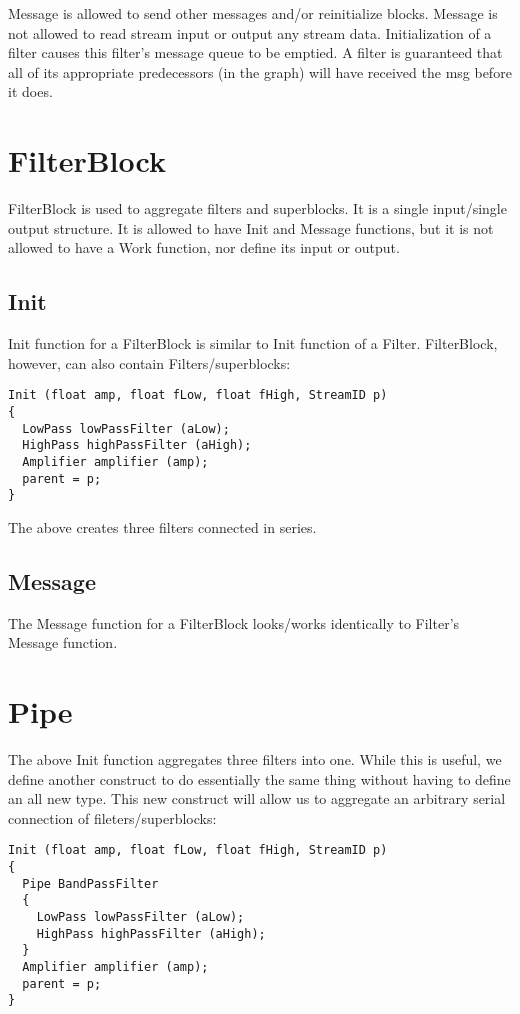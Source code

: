 Message is allowed to send other messages and/or reinitialize blocks.
Message is not allowed to read stream input or output any stream data.
Initialization of a filter causes this filter's message queue to be emptied.
A filter is guaranteed that all of its appropriate predecessors (in the graph)
will have received the msg before it does.

\section{FilterBlock}

FilterBlock is used to aggregate filters and superblocks.  It is a 
single input/single output structure.  It is allowed to have Init and Message
functions, but it is not allowed to have a Work function, nor define its
input or output.

\subsection{Init}

Init function for a FilterBlock is similar to Init function of a Filter.
FilterBlock, however, can also contain Filters/superblocks:

\begin{verbatim}
Init (float amp, float fLow, float fHigh, StreamID p)
{
  LowPass lowPassFilter (aLow);
  HighPass highPassFilter (aHigh);
  Amplifier amplifier (amp);
  parent = p;
}
\end{verbatim}

The above creates three filters connected in series.

\subsection{Message}

The Message function for a FilterBlock looks/works
identically to Filter's Message function.

\section{Pipe}

The above Init function aggregates three filters into one.  While this is
useful, we define another construct to do essentially the same thing
without having to define an all new type.  This new construct will
allow us to aggregate an arbitrary serial connection of fileters/superblocks:

\begin{verbatim}
Init (float amp, float fLow, float fHigh, StreamID p)
{
  Pipe BandPassFilter
  {
    LowPass lowPassFilter (aLow);
    HighPass highPassFilter (aHigh);
  } 
  Amplifier amplifier (amp);
  parent = p;
}
\end{verbatim}

